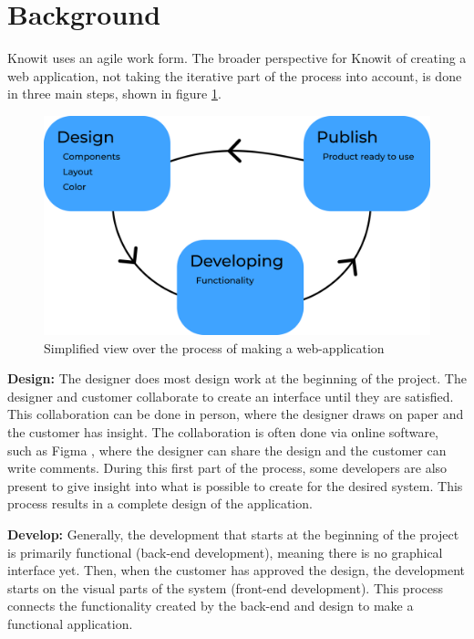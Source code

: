 \newpage
\section{Background}
Knowit uses an agile work form. The broader perspective for Knowit of creating a web application, not taking the iterative part of the process into account, is done in three main steps, shown in figure \ref{fig:ddp}. 

\begin{figure}[H]
  \centering
  \includegraphics[width=0.8\linewidth]{images/ddp.png}
  \caption{Simplified view over the process of making a web-application}%
  \label{fig:ddp}
\end{figure}


\textbf{Design:} The designer does most design work at the beginning of the project. The designer and customer collaborate to create an interface until they are satisfied. This collaboration can be done in person, where the designer draws on paper and the customer has insight. The collaboration is often done via online software, such as Figma \cite{FigmaCollaborativeInterface}, where the designer can share the design and the customer can write comments. During this first part of the process, some developers are also present to give insight into what is possible to create for the desired system. This process results in a complete design of the application. 

\textbf{Develop:} Generally, the development that starts at the beginning of the project is primarily functional (back-end development), meaning there is no graphical interface yet. Then, when the customer has approved the design, the development starts on the visual parts of the system (front-end development). This process connects the functionality created by the back-end and design to make a functional application.


